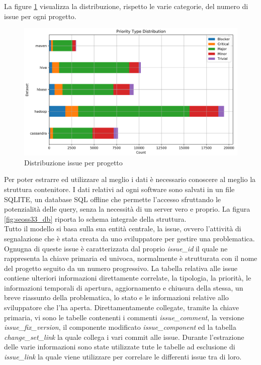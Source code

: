 \documentclass[%
    corpo=12pt,
    twoside,
    oldstyle,
    autoretitolo,
    greek,
    evenboxes,
]{toptesi}
\begin{document}
La figure \ref{fig:prior} visualizza la distribuzione, rispetto le varie categorie, del numero di issue per ogni progetto.
\begin{figure}[!ht]
  \includegraphics[width=\linewidth]{figure/prior.png}
  \caption{Distribuzione issue per progetto}
  \label{fig:prior}
\end{figure}
Per poter estrarre ed utilizzare al meglio i dati è necessario conoscere al meglio la struttura contenitore.
I dati relativi ad ogni software sono salvati in un file SQLITE, un database SQL offline che permette l'accesso sfruttando le potenzialità delle query, senza la necessità di un server vero e proprio. La figura \ref{fig:seoss33_db} riporta lo schema integrale della struttura.\\
Tutto il modello si basa sulla sua entità centrale, la issue, ovvero l'attività di segnalazione che è stata creata da uno sviluppatore per gestire una problematica. Ognugna di queste issue è caratterizzata dal proprio \textit{issue\_id} il quale ne rappresenta la chiave primaria ed univoca, normalmente è strutturata con il nome del progetto seguito da un numero progressivo. La tabella relativa alle issue contiene ulteriori informazioni direttamente correlate, la tipologia, la priorità, le informazioni temporali di apertura, aggiornamento e chiusura della stessa, un breve riassunto della problematica, lo stato e le informazioni relative allo sviluppatore che l'ha aperta. Direttamentamente collegate, tramite la chiave primaria, vi sono le tabelle contenenti i commenti \textit{issue\_comment}, la versione \textit{issue\_fix\_version}, il componente modificato \textit{issue\_component} ed la tabella \textit{change\_set\_link} la quale collega i vari commit alle issue. Durante l'estrazione delle varie informazioni sono state utilizzate tute le tabelle ad esclusione di \textit{issue\_link} la quale viene utilizzare per correlare le differenti issue tra di loro.
\end{document}
